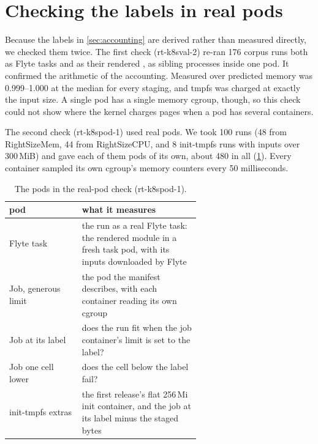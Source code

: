 \section{Checking the labels in real pods}
\label{sec:validation}

Because the labels in \cref{sec:accounting} are derived rather than measured directly, we
checked them twice. The first check (rt-k8sval-2) re-ran 176 corpus runs both as Flyte
tasks and as their rendered , as sibling processes inside one pod. It
confirmed the arithmetic of the accounting. Measured over predicted memory was
0.999--1.000 at the median for every staging, and tmpfs was charged at exactly the input
size. A single pod has a single memory cgroup, though, so this check could not show
where the kernel charges pages when a pod has several containers.

The second check (rt-k8spod-1) used real pods. We took 100 runs (48 from RightSizeMem, 44
from RightSizeCPU, and 8 init-tmpfs runs with inputs over 300\,MiB) and gave each of them
pods of its own, about 480 in all (\cref{tab:podprobe}). Every container sampled its own
cgroup's memory counters every 50 milliseconds.

\begin{table}[tbp]
\centering\small
\caption{The pods in the real-pod check (rt-k8spod-1).}
\label{tab:podprobe}
\begin{tabular}{@{}lp{0.62\linewidth}@{}}
\toprule
pod & what it measures \\
\midrule
Flyte task & the run as a real Flyte task: the rendered module in a fresh task pod, with its inputs downloaded by Flyte \\
Job, generous limit & the pod the manifest describes, with each container reading its own cgroup \\
Job at its label & does the run fit when the job container's limit is set to the label? \\
Job one cell lower & does the cell below the label fail? \\
init-tmpfs extras & the first release's flat 256\,Mi init container, and the job at its label minus the staged bytes \\
\bottomrule
\end{tabular}
\end{table}

